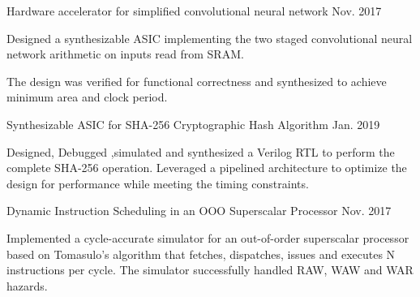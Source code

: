 \begin{cvprojects}
    \begin{flushleft}
    \par\addvspace{-1.5mm}
    \fontsize{10.4pt}{1em}\selectfont{}
    \end{flushleft}
    \par\addvspace{0.3ex}

    \cvproject
    {Hardware accelerator for simplified convolutional neural network }
    {\color{darkgray}Nov. 2017}
    {
      \begin{cvprojectitems}
        \item {Designed a synthesizable ASIC implementing the two staged convolutional neural network arithmetic on inputs read from SRAM. }
        \item {The design was verified for functional correctness and synthesized to achieve minimum area and clock period.} 
      \end{cvprojectitems}
    }

     \cvproject
    {Synthesizable ASIC for SHA-256 Cryptographic Hash Algorithm }
    {\color{darkgray}Jan. 2019}
    {
      \begin{cvprojectitems}
        \item {Designed, Debugged ,simulated and synthesized a Verilog RTL to perform the complete SHA-256 operation.  Leveraged a pipelined architecture to optimize the design for performance while meeting the timing constraints.  }
      \end{cvprojectitems}
    }

 

    \par\addvspace{1ex}
    \begin{flushleft}
    \par\addvspace{-1.5mm}
    \fontsize{10.4pt}{1em}\selectfont{}
    \end{flushleft}
    \par\addvspace{0.3ex}
    \cvproject
    {Dynamic Instruction Scheduling in an OOO Superscalar Processor }
    {\color{darkgray}Nov. 2017}
    {
      \begin{cvprojectitems}
        \item {Implemented a cycle-accurate simulator for an out-of-order superscalar processor based on Tomasulo’s algorithm that fetches, dispatches, issues and executes N instructions per cycle. The simulator successfully handled RAW, WAW and WAR hazards.}
      \end{cvprojectitems}
    }


\end{cvprojects}
